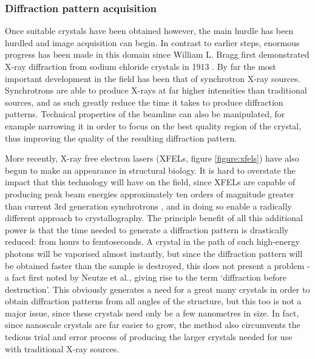 \documentclass[a4paper,11pt,twoside,openright]{scrbook}
\begin{document}
\subsubsection{Diffraction pattern acquisition}
Once suitable crystals have been obtained however, the main hurdle has been hurdled and image acquisition can begin. In contrast to earlier steps, enormous progress has been made in this domain since William L. Bragg first demonstrated X-ray diffraction from sodium chloride crystals in 1913 \cite{Bragg1913}. By far the most important development in the field has been that of synchrotron X-ray sources. Synchrotrons are able to produce X-rays at far higher intensities than traditional sources, and as such greatly reduce the time it takes to produce diffraction patterns. Technical properties of the beamline can also be manipulated, for example narrowing it in order to focus on the best quality region of the crystal, thus improving the quality of the resulting diffraction pattern.

More recently, X-ray free electron lasers (XFELs, figure \ref{figure:xfels}) have also begun to make an appearance in structural biology. It is hard to overstate the impact that this technology will have on the field, since XFELs are capable of producing peak beam energies approximately ten orders of magnitude greater than current 3rd generation synchrotrons \cite{Shi2014}, and in doing so enable a radically different approach to crystallography. The principle benefit of all this additional power is that the time needed to generate a diffraction pattern is drastically reduced: from hours to femtoseconds. A crystal in the path of such high-energy photons will be vaporised almost instantly, but since the diffraction pattern will be obtained faster than the sample is destroyed, this does not present a problem - a fact first noted by Neutze et al.\cite{Neutze2000}, giving rise to the term `diffraction before destruction'. This obviously generates a need for a great many crystals in order to obtain diffraction patterns from all angles of the structure, but this too is not a major issue, since these crystals need only be a few nanometres in size. In fact, since nanoscale crystals are far easier to grow, the method also circumvents the tedious trial and error process of producing the larger crystals needed for use with traditional X-ray sources.
\end{document}
